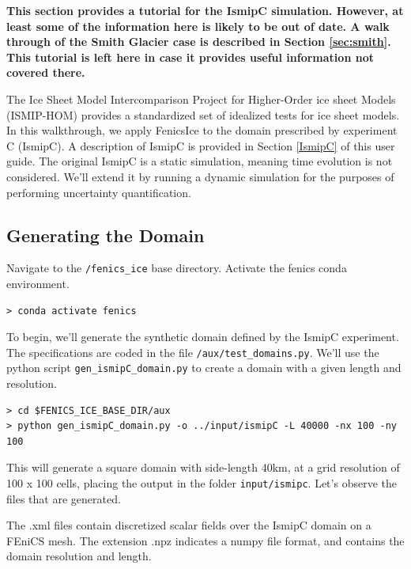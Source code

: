 \documentclass[11pt, reqno, nocenter]{article}
\begin{document}
\textbf{This section provides a tutorial for the IsmipC simulation. However, at least some of the information here is likely to be out of date. A walk through of the Smith Glacier case is described in Section \ref{sec:smith}. This tutorial is left here in case it provides useful information not covered there.}

The Ice Sheet Model Intercomparison Project for Higher-Order ice sheet Models (ISMIP-HOM) provides a standardized set of idealized tests for ice sheet models. In this walkthrough, we apply FenicsIce to the domain prescribed by experiment C (IsmipC). A description of IsmipC is provided in Section \ref{IsmipC} of this user guide. The original IsmipC is a static simulation, meaning time evolution is not considered. We'll extend it by running a dynamic simulation for the purposes of performing uncertainty quantification.


\subsection{Generating the Domain}

Navigate to the {\tt /fenics\_ice} base directory. Activate the fenics conda environment.

\begin{verbatim}
> conda activate fenics 
\end{verbatim}

To begin, we'll generate the synthetic domain defined by the IsmipC experiment. The specifications are coded in the file {\tt /aux/test\_domains.py}. We'll use the python script {\tt gen\_ismipC\_domain.py} to create a domain with a given length and resolution.

\begin{verbatim}
> cd $FENICS_ICE_BASE_DIR/aux 
> python gen_ismipC_domain.py -o ../input/ismipC -L 40000 -nx 100 -ny 100 
\end{verbatim}

This will generate a square domain with side-length 40\si{\kilo\metre}, at a grid resolution of 100 x 100 cells, placing the output in the folder {\tt input/ismipc}.
Let's observe the files that are generated.


The .xml files contain discretized scalar fields over the IsmipC domain on a FEniCS mesh. The extension .npz indicates a numpy file format, and contains the domain resolution and length.
\end{document}
